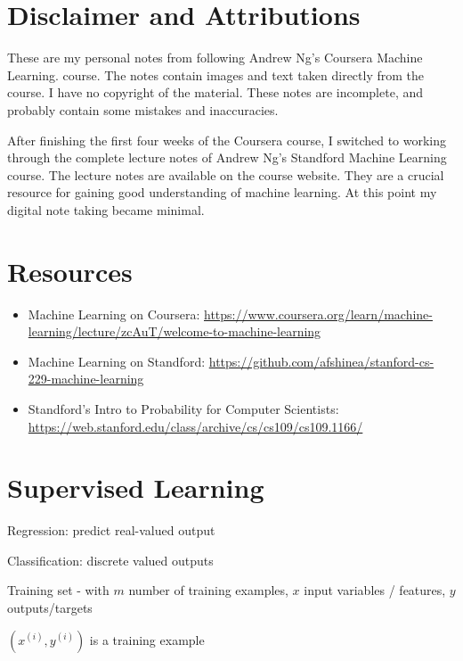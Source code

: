 \section*{Disclaimer and Attributions}

These are my personal notes from following Andrew Ng's Coursera Machine Learning. course. The notes contain images and text taken directly from the course. I have no copyright of the material. These notes are incomplete, and probably contain some mistakes and inaccuracies.

After finishing the first four weeks of the Coursera course, I switched to working through the complete lecture notes of Andrew Ng's Standford Machine Learning course. The lecture notes are available on the course website. They are a crucial resource for gaining good understanding of machine learning. At this point my digital note taking became minimal.

\section*{Resources}
\begin{itemize}
\item Machine Learning on Coursera: \url{https://www.coursera.org/learn/machine-learning/lecture/zcAuT/welcome-to-machine-learning}
\item Machine Learning on Standford: \url{https://github.com/afshinea/stanford-cs-229-machine-learning}
\item Standford's Intro to Probability for Computer Scientists: \url{https://web.stanford.edu/class/archive/cs/cs109/cs109.1166/}
\end{itemize}

\section{Supervised Learning}

Regression: predict real-valued output

Classification: discrete valued outputs

Training set - with $m$ number of training examples, $x$ input variables / features, $y$ outputs/targets

$(x^{(i)},y^{(i)})$ is a training example

